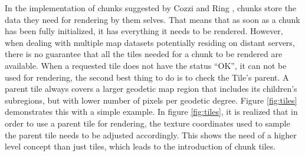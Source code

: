 In the implementation of chunks suggested by Cozzi and Ring \cite{cozzi11}, chunks store the data they need for rendering by them selves. That means that as soon as a chunk has been fully initialized, it has everything it needs to be rendered. However, when dealing with multiple map datasets potentially residing on distant servers, there is no guarantee that all the tiles needed for a chunk to be rendered are available.
When a requested tile does not have the status ``OK'', it can not be used for rendering, the second best thing to do is to check the Tile's parent. A parent tile always covers a larger geodetic map region that includes its children's subregions, but with lower number of pixels per geodetic degree. Figure \ref{fig:tiles} demonstrates this with a simple example.
In figure \ref{fig:tiles}, it is realized that in order to use a parent tile for rendering, the texture coordinates used to sample the parent tile needs to be adjusted accordingly. This shows the need of a higher level concept than just tiles, which leads to the introduction of chunk tiles.


